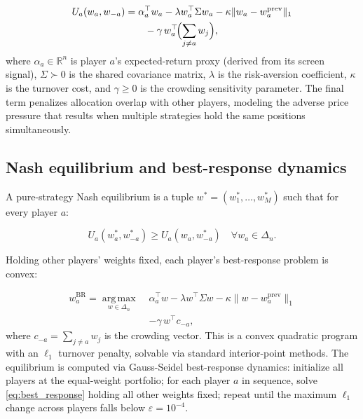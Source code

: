 \documentclass[journal,10pt]{IEEEtran}
\newcommand{\R}{\mathbb{R}}
\newcommand{\argmax}{\operatorname*{arg\,max}}
\begin{document}
\begin{equation}
\begin{aligned}
U_a(w_a,w_{-a})&=\alpha_a^\top w_a - \lambda w_a^\top\Sigma w_a - \kappa\|w_a-w_a^{\text{prev}}\|_1 \\
&\qquad - \gamma\, w_a^\top\!\Bigl(\sum_{j\neq a} w_j\Bigr),
\end{aligned}
\label{eq:player_utility}
\end{equation}
where $\alpha_a\in\R^n$ is player $a$'s expected-return proxy (derived from its screen signal), $\Sigma\succ0$ is the shared covariance matrix, $\lambda$ is the risk-aversion coefficient, $\kappa$ is the turnover cost, and $\gamma\ge0$ is the crowding sensitivity parameter. The final term penalizes allocation overlap with other players, modeling the adverse price pressure that results when multiple strategies hold the same positions simultaneously.

\subsection{Nash equilibrium and best-response dynamics}
A pure-strategy Nash equilibrium is a tuple $w^*=(w_1^*,\dots,w_M^*)$ such that for every player $a$:

\begin{equation}
U_a(w_a^*,w_{-a}^*)\ge U_a(w_a,w_{-a}^*)\quad\forall w_a\in\Delta_n.
\label{eq:nash_def}
\end{equation}

Holding other players' weights fixed, each player's best-response problem is convex:

\begin{equation}
\begin{aligned}
w_a^{\text{BR}}=\argmax_{w\in\Delta_n}\;&\alpha_a^\top w - \lambda w^\top\Sigma w - \kappa\|w-w_a^{\text{prev}}\|_1 \\
&- \gamma\, w^\top c_{-a},
\end{aligned}
\label{eq:best_response}
\end{equation}
where $c_{-a}=\sum_{j\neq a}w_j$ is the crowding vector. This is a convex quadratic program with an $\ell_1$ turnover penalty, solvable via standard interior-point methods. The equilibrium is computed via Gauss-Seidel best-response dynamics: initialize all players at the equal-weight portfolio; for each player $a$ in sequence, solve \eqref{eq:best_response} holding all other weights fixed; repeat until the maximum $\ell_1$ change across players falls below $\varepsilon=10^{-4}$.
\end{document}
